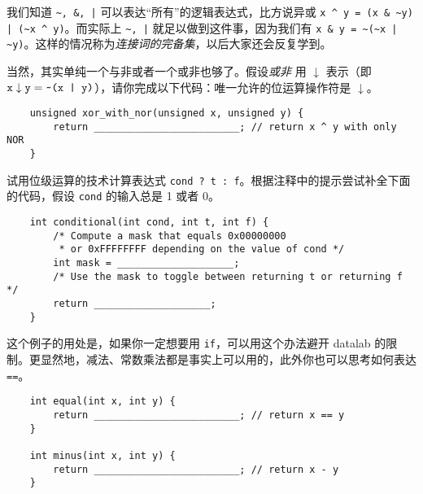     \begin{example}[de Morgan 律]
        我们知道 \verb+~, &, |+ 可以表达“所有”的逻辑表达式，比方说异或 \verb+x ^ y = (x & ~y) | (~x ^ y)+。而实际上 \verb+~, |+ 就足以做到这件事，因为我们有 \verb+x & y = ~(~x | ~y)+。这样的情况称为\emph{连接词的完备集}，以后大家还会反复学到。

        当然，其实单纯一个与非或者一个或非也够了。假设\emph{或非} 用 $\downarrow$ 表示（即 $\texttt{x} \downarrow \texttt{y} = \verb+~(x | y)+$），请你完成以下代码：唯一允许的位运算操作符是 $\downarrow$。
        \begin{verbatim}
    unsigned xor_with_nor(unsigned x, unsigned y) {
        return _________________________; // return x ^ y with only NOR
    }
        \end{verbatim}
    \end{example}

    \begin{example}[表达式]
        试用位级运算的技术计算表达式 \texttt{cond ? t : f}。根据注释中的提示尝试补全下面的代码，假设 \texttt{cond} 的输入总是 1 或者 0。
        \begin{verbatim}
    int conditional(int cond, int t, int f) {
        /* Compute a mask that equals 0x00000000
         * or 0xFFFFFFFF depending on the value of cond */
        int mask = ____________________;
        /* Use the mask to toggle between returning t or returning f */
        return ____________________;
    }
        \end{verbatim}
        这个例子的用处是，如果你一定想要用 \texttt{if}，可以用这个办法避开 datalab 的限制。更显然地，减法、常数乘法都是事实上可以用的，此外你也可以思考如何表达 \texttt{==}。
        \begin{verbatim}
    int equal(int x, int y) {
        return _________________________; // return x == y
    }

    int minus(int x, int y) {
        return _________________________; // return x - y
    }
        \end{verbatim}
    \end{example}

